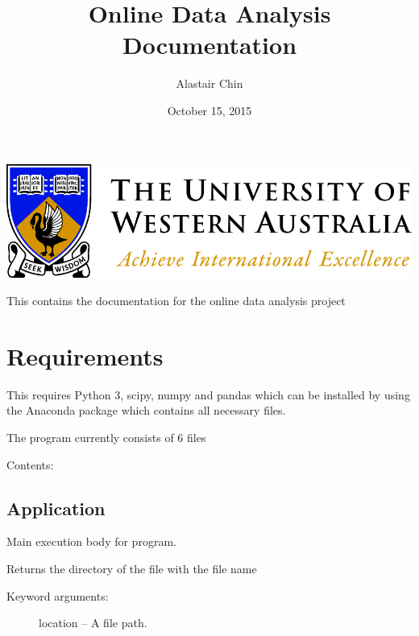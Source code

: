 \documentclass[letterpaper,10pt,english]{sphinxmanual}
\title{Online Data Analysis Documentation}
\date{October 15, 2015}
\author{Alastair Chin}
\begin{document}
\maketitle
\tableofcontents
{}\label{index::doc}


\includegraphics{UWA-logo.png}

This contains the documentation for the online data analysis project


\chapter{Requirements}
\label{index:welcome-to-online-data-analysis-s-documentation}\label{index:requirements}
This requires Python 3, scipy, numpy and pandas which can be installed
by using the Anaconda package which contains all necessary files.

The program currently consists of 6 files

Contents:


\section{Application}
\label{Code_rst/app:module-application}\label{Code_rst/app::doc}\label{Code_rst/app:application}
Main execution body for program.

\begin{fulllineitems}
\label{Code_rst/app:application.get_file_dir}
Returns the directory of the file with the file name
\begin{description}
\item[{Keyword arguments:}] \leavevmode
location -- A file path.

\end{description}

\end{fulllineitems}

\end{document}
